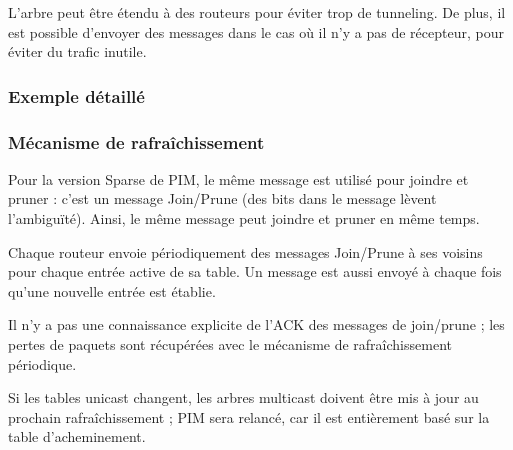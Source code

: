 		
		L'arbre peut être étendu à des routeurs pour éviter trop de tunneling. De plus, il est possible d'envoyer des messages dans le cas où il n'y a pas de récepteur, pour éviter du trafic inutile.
		
		\subsubsection{Exemple détaillé}
				
		
		
		
		
		
		\subsubsection{Mécanisme de rafraîchissement}
		
		Pour la version Sparse de PIM, le même message est utilisé pour joindre et pruner : c'est un message Join/Prune (des bits dans le message lèvent l'ambiguïté). Ainsi, le même message peut joindre et pruner en même temps.
		
		Chaque routeur envoie périodiquement des messages Join/Prune à ses voisins pour chaque entrée active de sa table. Un message est aussi envoyé à chaque fois qu'une nouvelle entrée est établie.
		
		Il n'y a pas une connaissance explicite de l'ACK des messages de join/prune ; les pertes de paquets sont récupérées avec le mécanisme de rafraîchissement périodique.
		
		Si les tables unicast changent, les arbres multicast doivent être mis à jour au prochain rafraîchissement ; PIM sera relancé, car il est entièrement basé sur la table d'acheminement.
